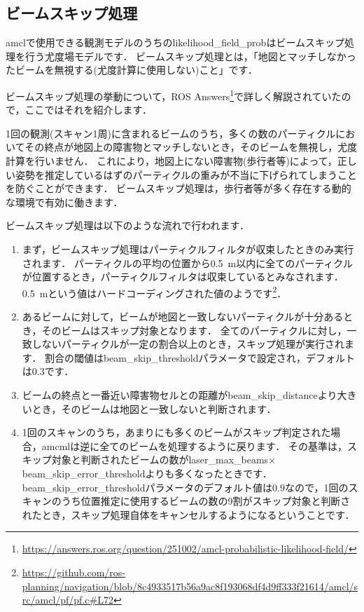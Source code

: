 \documentclass[{../../master}]{subfiles}
\begin{document}
\subsection{ビームスキップ処理}

\textsf{amcl}で使用できる観測モデルのうちの\textsf{likelihood\_field\_prob}はビームスキップ処理を行う尤度場モデルです．
ビームスキップ処理とは，「地図とマッチしなかったビームを無視する(尤度計算に使用しない)こと」です．

ビームスキップ処理の挙動について，ROS Answers\footnote{\url{https://answers.ros.org/question/251002/amcl-probabilistic-likelihood-field/}}で詳しく解説されていたので，ここではそれを紹介します．

1回の観測(スキャン1周)に含まれるビームのうち，多くの数のパーティクルにおいてその終点が地図上の障害物とマッチしないとき，そのビームを無視し，尤度計算を行いません．
これにより，地図上にない障害物(歩行者等)によって，正しい姿勢を推定しているはずのパーティクルの重みが不当に下げられてしまうことを防ぐことができます．
ビームスキップ処理は，歩行者等が多く存在する動的な環境で有効に働きます．

ビームスキップ処理は以下のような流れで行われます．

\begin{enumerate}
  \item まず，ビームスキップ処理はパーティクルフィルタが収束したときのみ実行されます．
        パーティクルの平均の位置から\SI{0.5}{m}以内に全てのパーティクルが位置するとき，パーティクルフィルタは収束しているとみなされます．
        \SI{0.5}{m}という値はハードコーディングされた値のようです\footnote{\url{https://github.com/ros-planning/navigation/blob/8c4933517b56a9ac8f193068df4d9ff333f21614/amcl/src/amcl/pf/pf.c\#L72}}．
  \item あるビームに対して，ビームが地図と一致しないパーティクルが十分あるとき，そのビームはスキップ対象となります．
        全てのパーティクルに対し，一致しないパーティクルが一定の割合以上のとき，スキップ処理が実行されます．
        割合の閾値は\textsf{beam\_skip\_threshold}パラメータで設定され，デフォルトは0.3です．
  \item ビームの終点と一番近い障害物セルとの距離が\textsf{beam\_skip\_distance}より大きいとき，そのビームは地図と一致しないと判断されます．
  \item 1回のスキャンのうち，あまりにも多くのビームがスキップ判定された場合，\textsf{amcml}は逆に全てのビームを処理するように戻ります．
        その基準は，スキップ対象と判断されたビームの数が\textsf{laser\_max\_beams}$\times$\textsf{beam\_skip\_error\_threshold}よりも多くなったときです．
        \textsf{beam\_skip\_error\_threshold}パラメータのデフォルト値は0.9なので，1回のスキャンのうち位置推定に使用するビームの数の9割がスキップ対象と判断されたとき，スキップ処理自体をキャンセルするようになるということです．
\end{enumerate}
\end{document}
